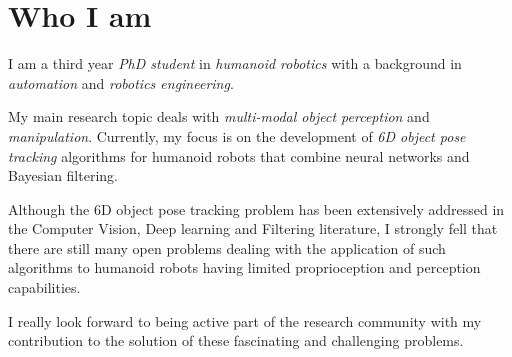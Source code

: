 \documentclass[11pt,a4paper,sans]{moderncv}        %
\begin{document}
\makecvtitle

\section{\textbf{Who I am}}
I am a third year \emph{PhD student} in \emph{humanoid robotics} with a background in \emph{automation} and \emph{robotics engineering}.
\par
My main research topic deals with \emph{multi-modal object perception} and \emph{manipulation}. Currently, my focus is on the development of \emph{6D object pose tracking} algorithms for humanoid robots that combine neural networks and Bayesian filtering.
\par
Although the 6D object pose tracking problem has been extensively addressed in the Computer Vision, Deep learning and Filtering literature, I strongly fell that there are still many open problems dealing with the application of such algorithms to humanoid robots having limited proprioception and perception capabilities.
\par
I really look forward to being active part of the research community with my contribution to the solution of these fascinating and challenging problems.
\end{document}
